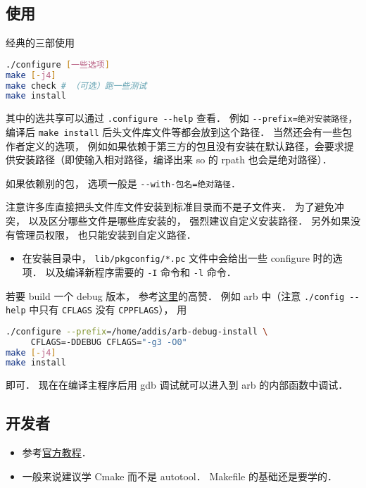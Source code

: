 
\begin{issues}
\issueDraft
\end{issues}



\subsection{使用}
经典的三部使用
\begin{lstlisting}[language=bash]
./configure [一些选项]
make [-j4]
make check # （可选）跑一些测试
make install
\end{lstlisting}
其中的选共享可以通过 \verb|.configure --help| 查看． 例如 \verb|--prefix=绝对安装路径|， 编译后 \verb|make install| 后头文件库文件等都会放到这个路径． 当然还会有一些包作者定义的选项， 例如如果依赖于第三方的包且没有安装在默认路径，会要求提供安装路径（即使输入相对路径，编译出来 so 的 rpath 也会是绝对路径）．

如果依赖别的包， 选项一般是 \verb|--with-包名=绝对路径|．

注意许多库直接把头文件库文件安装到标准目录而不是子文件夹． 为了避免冲突， 以及区分哪些文件是哪些库安装的， 强烈建议自定义安装路径． 另外如果没有管理员权限， 也只能安装到自定义路径．

\begin{itemize}
\item 在安装目录中， \verb|lib/pkgconfig/*.pc| 文件中会给出一些 configure 时的选项． 以及编译新程序需要的 \verb|-I| 命令和 \verb|-l| 命令．
\end{itemize}

若要 build 一个 debug 版本， 参考\href{https://stackoverflow.com/questions/4553735/gnu-autotools-debug-release-targets}{这里}的高赞． 例如 arb 中（注意 \verb|./config --help| 中只有 \verb|CFLAGS| 没有 \verb|CPPFLAGS|）， 用
\begin{lstlisting}[language=bash]
./configure --prefix=/home/addis/arb-debug-install \
     CFLAGS=-DDEBUG CFLAGS="-g3 -O0"
make [-j4]
make install
\end{lstlisting}
即可． 现在在编译主程序后用 gdb 调试就可以进入到 arb 的内部函数中调试．

\subsection{开发者}
\begin{itemize}
\item 参考\href{https://www.gnu.org/software/automake/manual/html_node/Autotools-Introduction.html}{官方教程}．
\item 一般来说建议学 Cmake\upref{CMakeN} 而不是 autotool． Makefile 的基础还是要学的．
\end{itemize}
